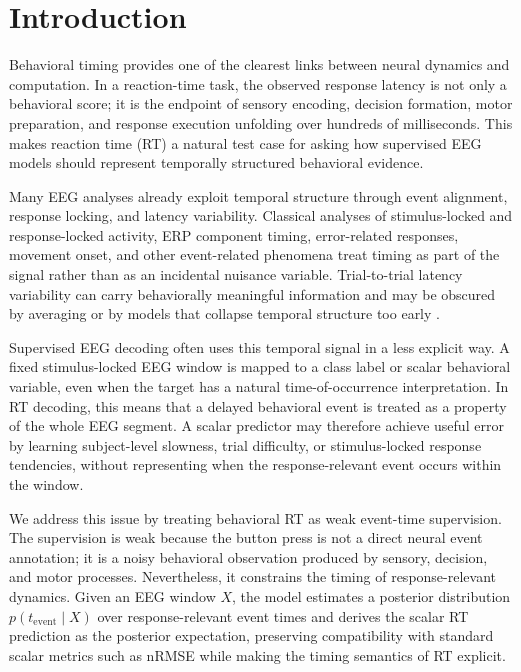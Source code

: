 \documentclass[12pt]{article}
\begin{document}
\section{Introduction}

Behavioral timing provides one of the clearest links between neural dynamics and computation. In a reaction-time task, the observed response latency is not only a behavioral score; it is the endpoint of sensory encoding, decision formation, motor preparation, and response execution unfolding over hundreds of milliseconds. This makes reaction time (RT) a natural test case for asking how supervised EEG models should represent temporally structured behavioral evidence.

Many EEG analyses already exploit temporal structure through event alignment, response locking, and latency variability. Classical analyses of stimulus-locked and response-locked activity, ERP component timing, error-related responses, movement onset, and other event-related phenomena treat timing as part of the signal rather than as an incidental nuisance variable. Trial-to-trial latency variability can carry behaviorally meaningful information and may be obscured by averaging or by models that collapse temporal structure too early \citep{Jung1998SingleTrialERP,Ouyang2017LatencyReview}.

Supervised EEG decoding often uses this temporal signal in a less explicit way. A fixed stimulus-locked EEG window is mapped to a class label or scalar behavioral variable, even when the target has a natural time-of-occurrence interpretation. In RT decoding, this means that a delayed behavioral event is treated as a property of the whole EEG segment. A scalar predictor may therefore achieve useful error by learning subject-level slowness, trial difficulty, or stimulus-locked response tendencies, without representing when the response-relevant event occurs within the window.

We address this issue by treating behavioral RT as weak event-time supervision. The supervision is weak because the button press is not a direct neural event annotation; it is a noisy behavioral observation produced by sensory, decision, and motor processes. Nevertheless, it constrains the timing of response-relevant dynamics. Given an EEG window \(X\), the model estimates a posterior distribution \(p(t_{\mathrm{event}}\mid X)\) over response-relevant event times and derives the scalar RT prediction as the posterior expectation, preserving compatibility with standard scalar metrics such as nRMSE while making the timing semantics of RT explicit.
\end{document}
